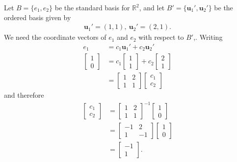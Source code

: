 \documentclass[12pt,letterpaper,reqno]{article}
\numberwithin{equation}{section}
\newcommand{\R}{\ensuremath{\mathbb R}}
\newcommand{\bu}{\mathbf{u}}
\begin{document}
\begin{example}\label{ex:transition_matrix_from_std_r_2}
Let $B=\{e_1,e_2\}$ be the standard basis for $\R^2$, and let $B'=\{\bu_1',\bu_2'\}$ be the ordered basis given by
\begin{align*}
	\bu_1'=(1,1), \ \bu_2'=(2,1).
\end{align*}
We need the coordinate vectors of $e_1$ and $e_2$ with respect to $B'$,. Writing 
\begin{align*}
	e_1&=c_1\bu_1'+c_2\bu_2' \\
	\begin{bmatrix}
		1\\ 0 
	\end{bmatrix}&=c_1\begin{bmatrix}
1 \\1	
\end{bmatrix}+c_2\begin{bmatrix}
	2 \\1
\end{bmatrix} \\
&=\begin{bmatrix}
	1 & 2 \\ 1 & 1
\end{bmatrix}\begin{bmatrix}
	c_1 \\ c_2
\end{bmatrix}
\end{align*}
and therefore
\begin{align*}
	\begin{bmatrix}
		c_1 \\ c_2
	\end{bmatrix}&=\begin{bmatrix}
	1 & 2 \\ 1 & 1
\end{bmatrix}^{-1}\begin{bmatrix}
	1 \\ 0
\end{bmatrix} \\
&=\begin{bmatrix}
	-1 & 2 \\ 1 & -1
\end{bmatrix}\begin{bmatrix}
	1 \\ 0
\end{bmatrix} \\
&=\begin{bmatrix}
		-1 \\ 1
	\end{bmatrix}.

\end{align*}
\end{example}
\end{document}
